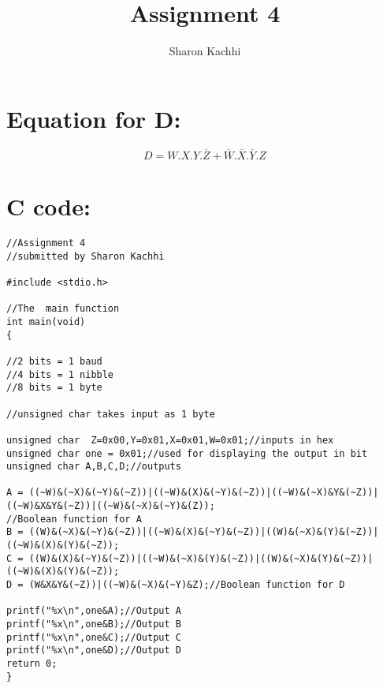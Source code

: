 \documentclass{article}
\title{Assignment 4}
\author{Sharon Kachhi}
\begin{document}
\maketitle
\section{Equation for D:}
\begin{equation}
    D = W.X.Y.\overline{Z}+\overline{W}.\overline{X}.\overline{Y}.Z
\end{equation}
\section{C code:}
\begin{lstlisting}[style=CStyle]
//Assignment 4 
//submitted by Sharon Kachhi

#include <stdio.h>

//The  main function
int main(void)
{

//2 bits = 1 baud
//4 bits = 1 nibble
//8 bits = 1 byte

//unsigned char takes input as 1 byte

unsigned char  Z=0x00,Y=0x01,X=0x01,W=0x01;//inputs in hex	
unsigned char one = 0x01;//used for displaying the output in bit
unsigned char A,B,C,D;//outputs

A = ((~W)&(~X)&(~Y)&(~Z))|((~W)&(X)&(~Y)&(~Z))|((~W)&(~X)&Y&(~Z))|((~W)&X&Y&(~Z))|((~W)&(~X)&(~Y)&(Z));
//Boolean function for A
B = ((W)&(~X)&(~Y)&(~Z))|((~W)&(X)&(~Y)&(~Z))|((W)&(~X)&(Y)&(~Z))|((~W)&(X)&(Y)&(~Z));
C = ((W)&(X)&(~Y)&(~Z))|((~W)&(~X)&(Y)&(~Z))|((W)&(~X)&(Y)&(~Z))|((~W)&(X)&(Y)&(~Z));
D = (W&X&Y&(~Z))|((~W)&(~X)&(~Y)&Z);//Boolean function for D

printf("%x\n",one&A);//Output A
printf("%x\n",one&B);//Output B
printf("%x\n",one&C);//Output C
printf("%x\n",one&D);//Output D
return 0;
}
\end{lstlisting}
\end{document}
